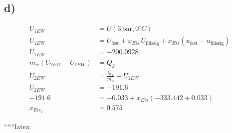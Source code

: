 

\subsection*{d)}
\begin{align*}
    U_{1EW} &= U (3 \, \text{bar}, 0^\circ C) \\
    U_{1EW} &= U_{\text{fest}} + x_{Eis} \, U_{\text{flüssig}} + x_{Eis} (u_{\text{fest}} - u_{\text{flüssig}}) \\
    U_{1EW} &= -200.0928 \\
    m_w (U_{2EW} - U_{1EW}) &= Q_k \\
    U_{2EW} &= \frac{Q_k}{m_w} + U_{1EW} \\
    U_{2EW} &= -191.6 \\
    -191.6 &= -0.033 + x_{Eis} ( -333.442 + 0.033) \\
    x_{Eis_2} &= \underline{0.575}
\end{align*}

``````latex